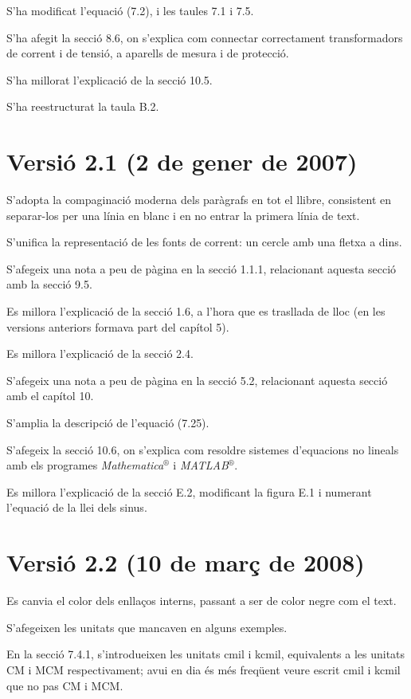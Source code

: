  S'ha modificat l'equació (7.2),
i les taules 7.1 i 7.5.

S'ha afegit la secció 8.6, on s'explica com
connectar correctament transformadors de corrent i de tensió, a
aparells de mesura i de protecció.

S'ha millorat l'explicació de la secció 10.5.

S'ha reestructurat la taula B.2.

\section*{Versió 2.1 (2 de gener de 2007)}

S'adopta la compaginació moderna dels paràgrafs en tot el llibre, consistent en separar-los per una línia en blanc i en no entrar la primera línia de text.

S'unifica la representació de les fonts de corrent: un cercle amb una fletxa a dins.

S'afegeix una nota a peu de pàgina en la secció 1.1.1, relacionant aquesta secció amb la secció 9.5.

Es millora l'explicació de la secció 1.6, a l'hora que es trasllada de lloc (en les versions anteriors formava part del capítol 5).

Es millora l'explicació de la secció 2.4.

S'afegeix una nota a peu de pàgina en la secció 5.2, relacionant aquesta secció amb el capítol 10.

S'amplia la descripció de l'equació (7.25).

S'afegeix la secció 10.6, on s'explica com resoldre sistemes d'equacions no lineals amb els programes \textit{Mathematica}${}^\circledR$ i \textit{MATLAB}${}^\circledR$.

Es millora l'explicació de la secció E.2, modificant la figura E.1 i numerant l'equació de la llei dels sinus.

\section*{Versió 2.2 (10 de març de 2008)}

Es canvia el color dels enllaços interns, passant a ser de color negre com el text.

S'afegeixen les unitats que mancaven en alguns exemples.

En la secció 7.4.1, s'introdueixen les unitats cmil i kcmil, equivalents a les unitats CM i MCM respectivament; avui en dia és més freqüent veure escrit cmil i kcmil que no pas CM i MCM.

